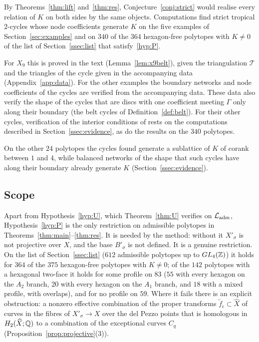 By Theorems~\ref{thm:lift} and~\ref{thm:res}, Conjecture~\ref{conj:strict} would realise every relation of $K$ on both
sides by the same objects. Computations find strict tropical $2$-cycles whose node coefficients generate $K$ on the
five examples of Section~\ref{sec:examples} and on $340$ of the $364$ hexagon-free polytopes with $K\neq0$ of the list
of Section~\ref{ssec:list} that satisfy~\ref{hyp:P}.

For $X_9$ this is proved in the text (Lemma~\ref{lem:x9belt}), given the triangulation $\mathcal T$ and the triangles of the
cycle given in the accompanying data (Appendix~\ref{app:data}). For the other examples the boundary networks and node
coefficients of the cycles are verified from the accompanying data. These data also verify the shape of the cycles that
are discs with one coefficient meeting $\Gamma$ only along their boundary (the belt cycles of Definition~\ref{def:belt}).
For their other cycles, verification of the interior conditions of \cite[Def.~7.2]{CBM} rests on the computations
described in Section~\ref{ssec:evidence}, as do the results on the $340$ polytopes.

On the other $24$ polytopes the
cycles found generate a sublattice of $K$ of corank between $1$ and $4$, while balanced networks of the shape that such
cycles have along their boundary already generate $K$ (Section~\ref{ssec:evidence}).

\subsection{Scope}\label{ssec:scope}
Apart from Hypothesis~\ref{hyp:U}, which Theorem~\ref{thm:U} verifies on $\mathcal L_{\rm adm}$, Hypothesis~\ref{hyp:P} is the only
restriction on admissible polytopes in Theorems~\ref{thm:main}--\ref{thm:res}.
It is needed by the method: without it $X'_\sigma$ is not projective over $X$, and the base $B'_\sigma$ is not defined.
It is a genuine restriction. On the list of Section~\ref{ssec:list} ($612$ admissible polytopes up to $GL_4(\mathbb Z)$) it holds
for $364$ of the $375$ hexagon-free polytopes with $K\neq0$; of the $142$ polytopes with a hexagonal two-face it holds
for some profile on $83$ ($55$ with every hexagon on the $A_2$ branch, $20$ with every hexagon on the $A_1$ branch, and
$18$ with a mixed profile, with overlaps), and for no profile on $59$. Where it fails there is an explicit obstruction: a nonzero
effective combination of the proper transforms $\tilde f_\epsilon\subset\widehat X$ of curves in the fibres of
$X'_\sigma\to X$ over the del Pezzo points that is homologous in $H_2(\widehat X;\mathbb Q)$ to a combination of the
exceptional curves $C_q$ (Proposition~\ref{prop:projective}(3)).

